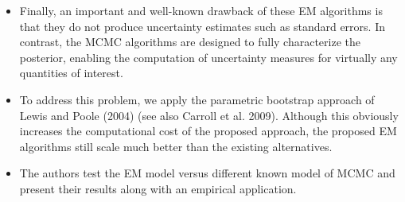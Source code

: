 \documentclass[a4paper,12pt]{article}
\begin{document}
\begin{enumerate}
\begin{itemize}
\item Finally, an important and well-known drawback of these EM algorithms is that they do not produce uncertainty estimates such as standard errors. In contrast, the MCMC algorithms are designed to fully characterize the posterior, enabling the computation of uncertainty measures for virtually any quantities of interest. 
\item To address this problem, we apply the parametric bootstrap approach of Lewis and Poole (2004) (see also Carroll et al. 2009). Although this obviously increases the computational cost of the proposed approach, the proposed EM algorithms still scale much better than the existing alternatives. 
\item The authors test the EM model versus different known model of MCMC and present their results along with an empirical application. 
\end{itemize}




\newpage



\end{enumerate}
\end{document}
